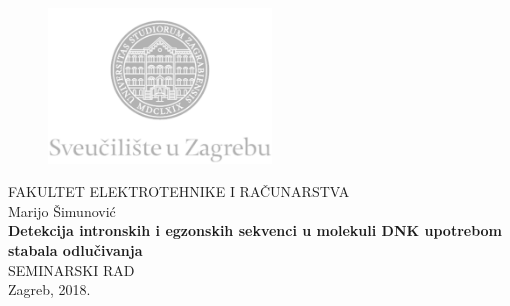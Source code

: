 \documentclass[12pt,oneside, a4paper]{article}
\numberwithin{equation}{section}
\renewcommand{\_}{\textscale{.7}{\textunderscore}}
\begin{document}
\begin{titlepage}
  \fontsize{16pt}{20pt}\selectfont
  \selectfont
  \setlength{\intextsep}{0pt plus 0pt minus 0pt}

  \begin{center}
    \begin{figure}[ht!]
      \begin{center}
        \includegraphics[height=4.1184cm, width=5.94cm]{logo_unizg2}
      \end{center}
    \end{figure}		
    \vspace{0cm}
    {FAKULTET ELEKTROTEHNIKE I RAČUNARSTVA} \\
    \vspace{3cm}
    Marijo Šimunović \\
    \vspace{2cm}
    {\fontsize{22pt}{22pt}\selectfont\textbf{Detekcija intronskih i egzonskih sekvenci u molekuli DNK upotrebom stabala odlučivanja}} \\
    \vspace{2cm}    
    SEMINARSKI RAD \\
    \vspace{5cm}    %
    \vfill{Zagreb, 2018.}
  \end{center}
  \restoregeometry
\end{titlepage}

\tableofcontents
\clearpage
\listoffigures
\clearpage %
\listoftables

\clearpage

\end{document}
